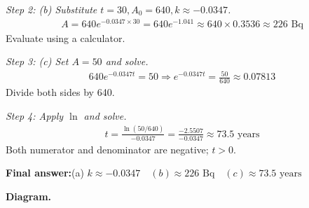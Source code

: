 \documentclass[11pt]{article}
\begin{document}
\textit{Step 2: (b) Substitute \( t = 30, A_0 = 640, k \approx -0.0347 \).}
\[\begin{gathered}
A = 640e^{-0.0347 \times 30} = 640e^{-1.041} \approx 640 \times 0.3536 \approx 226 \text{ Bq}
\end{gathered}\]
Evaluate using a calculator.

\textit{Step 3: (c) Set \( A = 50 \) and solve.}
\[\begin{gathered}
640e^{-0.0347t} = 50 \Rightarrow e^{-0.0347t} = \frac{50}{640} \approx 0.07813
\end{gathered}\]
Divide both sides by 640.

\textit{Step 4: Apply \( \ln \) and solve.}
\[\begin{gathered}
t = \frac{\ln(50/640)}{-0.0347} = \frac{-2.5507}{-0.0347} \approx 73.5 \text{ years}
\end{gathered}\]
Both numerator and denominator are negative; \( t > 0 \).

\begin{answerbox}
\textbf{Final answer:}\quad (a) \(\displaystyle  k \approx -0.0347 \)\(\displaystyle  \quad  (b) \approx 226 \text{ Bq} \quad  (c) \approx 73.5 \text{ years}\)
\end{answerbox}
\textbf{Diagram.}
\end{document}
